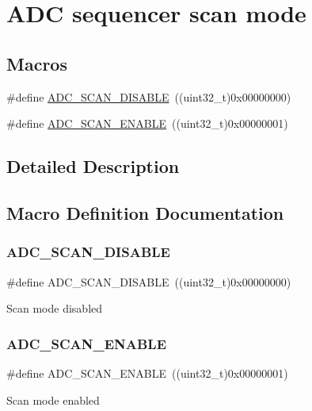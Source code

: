 \hypertarget{group___a_d_c___scan__mode}{}\section{A\+DC sequencer scan mode}
\label{group___a_d_c___scan__mode}
\subsection*{Macros}
\begin{DoxyCompactItemize}
\item 
\#define \mbox{\hyperlink{group___a_d_c___scan__mode_ga6e269121b26e999155863ce52c522883}{A\+D\+C\+\_\+\+S\+C\+A\+N\+\_\+\+D\+I\+S\+A\+B\+LE}}~((uint32\+\_\+t)0x00000000)
\item 
\#define \mbox{\hyperlink{group___a_d_c___scan__mode_ga1e109b8619961829ff2bc368c1725382}{A\+D\+C\+\_\+\+S\+C\+A\+N\+\_\+\+E\+N\+A\+B\+LE}}~((uint32\+\_\+t)0x00000001)
\end{DoxyCompactItemize}


\subsection{Detailed Description}


\subsection{Macro Definition Documentation}
\mbox{\label{group___a_d_c___scan__mode_ga6e269121b26e999155863ce52c522883}} 
\subsubsection{\texorpdfstring{ADC\_SCAN\_DISABLE}{ADC\_SCAN\_DISABLE}}
{\footnotesize\ttfamily \#define A\+D\+C\+\_\+\+S\+C\+A\+N\+\_\+\+D\+I\+S\+A\+B\+LE~((uint32\+\_\+t)0x00000000)}

Scan mode disabled \mbox{\label{group___a_d_c___scan__mode_ga1e109b8619961829ff2bc368c1725382}} 
\subsubsection{\texorpdfstring{ADC\_SCAN\_ENABLE}{ADC\_SCAN\_ENABLE}}
{\footnotesize\ttfamily \#define A\+D\+C\+\_\+\+S\+C\+A\+N\+\_\+\+E\+N\+A\+B\+LE~((uint32\+\_\+t)0x00000001)}

Scan mode enabled 